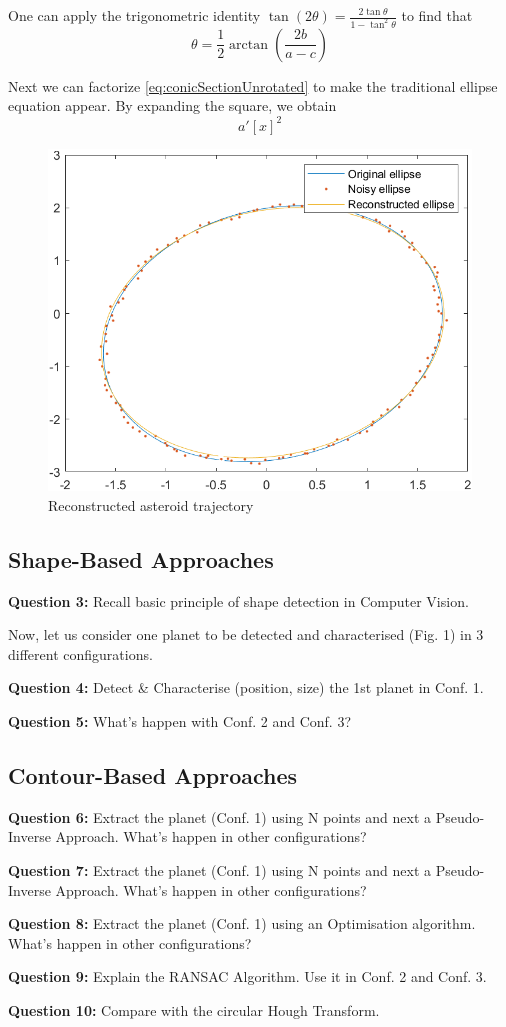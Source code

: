 One can apply the trigonometric identity $\tan(2\theta) = \frac{2\tan\theta}{1 - \tan^2\theta}$ to find that
\begin{equation}
    \theta = \frac{1}{2} \arctan \left( \frac{2b}{a - c} \right)
\end{equation}

Next we can factorize \autoref{eq:conicSectionUnrotated} to make the traditional ellipse equation appear. By expanding the square, we obtain
\begin{equation}
    a' \left[ x\right]^2
\end{equation}

\begin{figure}[!ht]
    \centering
    \includegraphics[width=0.5\linewidth]{Doc/Graphics/Part3/ReconstructedAsteroidTrajectory.png}
    \caption{Reconstructed asteroid trajectory}
    \label{fig:ReconstructedAsteroidTrajectory}
\end{figure}


\subsection{Shape-Based Approaches}

\textbf{Question 3:} Recall basic principle of shape detection in Computer Vision.

Now, let us consider one planet to be detected and characterised (Fig. 1) in 3 different configurations.

\textbf{Question 4:} Detect \& Characterise (position, size) the 1st planet in Conf. 1.

\textbf{Question 5:} What’s happen with Conf. 2 and Conf. 3?








\subsection{Contour-Based Approaches}

\textbf{Question 6:} Extract the planet (Conf. 1) using N points and next a Pseudo-Inverse Approach. What’s happen in other configurations?

\textbf{Question 7:} Extract the planet (Conf. 1) using N points and next a Pseudo-Inverse Approach. What’s happen in other configurations?

\textbf{Question 8:} Extract the planet (Conf. 1) using an Optimisation algorithm. What’s happen in other configurations?

\textbf{Question 9:} Explain the RANSAC Algorithm. Use it in Conf. 2 and Conf. 3.

\textbf{Question 10:} Compare with the circular Hough Transform.